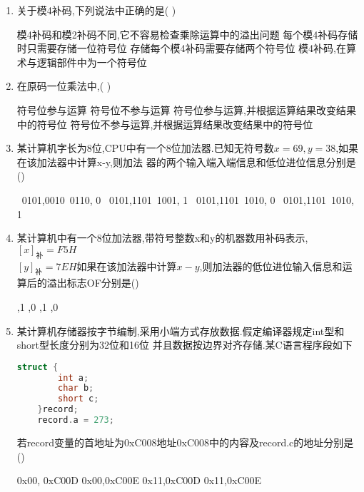\documentclass[12pt, a4paper, oneside, UTF8]{ctexbook}
\begin{document}
\begin{enumerate}
    \item 关于模4补码,下列说法中正确的是(   ) 
    \begin{choices}[1]
        \task 模4补码和模2补码不同,它不容易检查乘除运算中的溢出问题
        \task 每个模4补码存储时只需要存储一位符号位
        \task 存储每个模4补码需要存储两个符号位
        \task 模4补码,在算术与逻辑部件中为一个符号位
    \end{choices}


    \item 在原码一位乘法中,(   ) 
    \begin{choices}[1]
        \task 符号位参与运算
        \task 符号位不参与运算
        \task 符号位参与运算,并根据运算结果改变结果中的符号位
        \task 符号位不参与运算,并根据运算结果改变结果中的符号位
    \end{choices}


    \item \bl 某计算机字长为8位,CPU中有一个8位加法器.已知无符号数$x=69,y=38$,如果在该加法器中计算x-y,则加法
    器的两个输入端入端信息和低位进位信息分别是() 
    \begin{choices}[2]
        \ 0101,0010\ 0110, 0
        \ 0101,1101\ 1001, 1
        \ 0101,1101\ 1010, 0
        \ 0101,1101\ 1010, 1
    \end{choices}

    \item 某计算机中有一个8位加法器,带符号整数x和y的机器数用补码表示,$[x]_{\text{补}}=F5H$\\ 
    $[y]_{\text{补}}=7EH$如果在该加法器中计算$x-y$,则加法器的低位进位输入信息和运算后的溢出标志OF分别是()
    \begin{choices}
        ,1 
        ,0
        ,1 
        ,0
    \end{choices}

    \item \bt 某计算机存储器按字节编制,采用小端方式存放数据.假定编译器规定int型和short型长度分别为32位和16位
    并且数据按边界对齐存储.某C语言程序段如下
    \begin{center}
    \begin{lstlisting}[language=C]
    struct {
        int a;
        char b;
        short c;
    }record;
    record.a = 273;
    \end{lstlisting}
    \end{center}
    若record变量的首地址为0xC008地址0xC008中的内容及record.c的地址分别是()
    \begin{choices}
        \task 0x00, 0xC00D
        \task 0x00,0xC00E
        \task 0x11,0xC00D
        \task 0x11,0xC00E
    \end{choices}



\end{enumerate}
\end{document}
